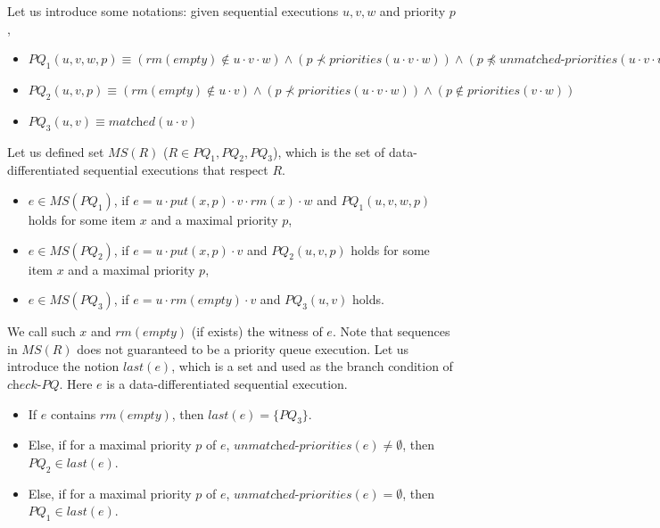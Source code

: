 Let us introduce some notations: given sequential executions $u,v,w$ and priority $p$,

\begin{itemize}
\setlength{\itemsep}{0.5pt}
\item[-] $\textit{PQ}_1(u,v,w,p) \equiv
(\textit{rm}(\textit{empty}) \notin u \cdot v \cdot w) \wedge
(p \not\prec \textit{priorities}(u \cdot v \cdot w)) \wedge
(p \not\preceq \textit{unmatched-priorities}(u \cdot v \cdot w)) \wedge
(\textit{matched}_{\prec}(u \cdot v,p) ) \wedge
(p \notin \textit{priorities}(v \cdot w))$

\item[-] $\textit{PQ}_2(u,v,p) \equiv
(\textit{rm}(\textit{empty}) \notin u \cdot v) \wedge
(p \not\prec \textit{priorities}(u \cdot v \cdot w)) \wedge
(p \notin \textit{priorities}(v \cdot w))$

\item[-] $\textit{PQ}_3(u,v) \equiv
\textit{matched}(u \cdot v)$
\end{itemize}


Let us defined set $\textit{MS}(R)$ ($R \in \textit{PQ}_1,\textit{PQ}_2,\textit{PQ}_3$), which is the set of data-differentiated sequential executions that respect $R$.

\begin{itemize}
\setlength{\itemsep}{0.5pt}
\item[-] $e \in \textit{MS}(\textit{PQ}_1)$, if $e = u \cdot \textit{put}(x,p) \cdot v \cdot \textit{rm}(x) \cdot w$ and $\textit{PQ}_1(u,v,w,p)$ holds for some item $x$ and a maximal priority $p$,

\item[-] $e \in \textit{MS}(\textit{PQ}_2)$, if $e = u \cdot \textit{put}(x,p) \cdot v$ and $\textit{PQ}_2(u,v,p)$ holds for some item $x$ and a maximal priority $p$,

\item[-] $e \in \textit{MS}(\textit{PQ}_3)$, if $e = u \cdot \textit{rm}(\textit{empty}) \cdot v$ and $\textit{PQ}_3(u,v)$ holds.
\end{itemize}

We call such $x$ and $\textit{rm}(\textit{empty})$ (if exists) the witness of $e$. Note that sequences in $\textit{MS}(R)$ does not guaranteed to be a priority queue execution. Let us introduce the notion $\textit{last}(e)$, which is a set and used as the branch condition of $\textit{check-PQ}$. Here $e$ is a data-differentiated sequential execution.

\begin{itemize}
\setlength{\itemsep}{0.5pt}
\item[-] If $e$ contains $\textit{rm}(\textit{empty})$, then $\textit{last}(e) = \{ \textit{PQ}_3 \}$.

\item[-] Else, if for a maximal priority $p$ of $e$, $\textit{unmatched-priorities}(e) \neq \emptyset$, then $\textit{PQ}_2 \in \textit{last}(e)$.

\item[-] Else, if for a maximal priority $p$ of $e$, $\textit{unmatched-priorities}(e) = \emptyset$, then $\textit{PQ}_1 \in \textit{last}(e)$.
\end{itemize}

